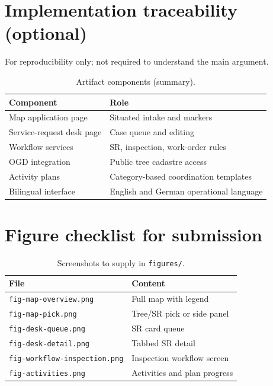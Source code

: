 \documentclass[12pt,a4paper]{article}
\begin{document}
\appendix
\section{Implementation traceability (optional)}
\label{app:trace}

\noindent For reproducibility only; not required to understand the main argument.

\begin{table}[htbp]
\centering
\caption{Artifact components (summary).}
\small
\begin{tabular}{@{}ll@{}}
\toprule
\textbf{Component} & \textbf{Role} \\
\midrule
Map application page & Situated intake and markers \\
Service-request desk page & Case queue and editing \\
Workflow services & SR, inspection, work-order rules \\
OGD integration & Public tree cadastre access \\
Activity plans & Category-based coordination templates \\
Bilingual interface & English and German operational language \\
\bottomrule
\end{tabular}
\end{table}

\section{Figure checklist for submission}
\label{app:figures}

\begin{table}[htbp]
\centering
\caption{Screenshots to supply in \texttt{figures/}.}
\begin{tabular}{@{}ll@{}}
\toprule
\textbf{File} & \textbf{Content} \\
\midrule
\texttt{fig-map-overview.png} & Full map with legend \\
\texttt{fig-map-pick.png} & Tree/SR pick or side panel \\
\texttt{fig-desk-queue.png} & SR card queue \\
\texttt{fig-desk-detail.png} & Tabbed SR detail \\
\texttt{fig-workflow-inspection.png} & Inspection workflow screen \\
\texttt{fig-activities.png} & Activities and plan progress \\
\bottomrule
\end{tabular}
\end{table}
\end{document}
